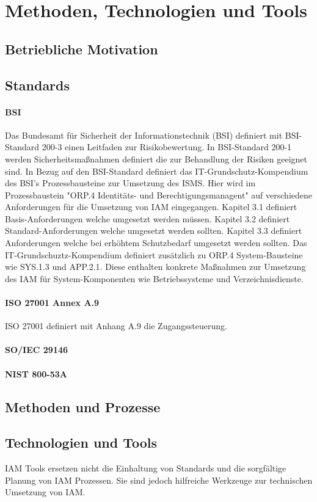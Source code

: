 \documentclass[10pt]{article}
\begin{document}
\section{Methoden, Technologien und Tools}
\subsection{Betriebliche Motivation}
\subsection{Standards}
\paragraph{BSI}
Das Bundesamt für Sicherheit der Informationstechnik (BSI) definiert mit BSI-Standard 200-3 einen Leitfaden zur Risikobewertung. In BSI-Standard 200-1 werden Sicherheitsmaßnahmen definiert die zur Behandlung der Risiken geeignet sind. In Bezug auf den BSI-Standard definiert das IT-Grundschutz-Kompendium des BSI's Prozessbausteine zur Umsetzung des ISMS. Hier wird im Prozessbaustein "ORP.4 Identitäts- und Berechtigungsmanagent" auf verschiedene Anforderungen für die Umsetzung von IAM eingegangen. Kapitel 3.1 definiert Basis-Anforderungen welche umgesetzt werden müssen. Kapitel 3.2 definiert Standard-Anforderungen welche umgesetzt werden sollten. Kapitel 3.3 definiert Anforderungen welche bei erhöhtem Schutzbedarf umgesetzt werden sollten. Das IT-Grundschuztz-Kompendium definiert zusätzlich zu ORP.4 System-Bausteine wie SYS.1.3 und APP.2.1. Diese enthalten konkrete Maßnahmen zur Umsetzung des IAM für System-Komponenten wie Betriebssysteme und Verzeichnisdienste.
\paragraph{ISO 27001 Annex A.9}
ISO 27001 definiert mit Anhang A.9 die Zugangssteuerung.
\paragraph{SO/IEC 29146}
\paragraph{NIST 800-53A}
\subsection{Methoden und Prozesse}
\subsection{Technologien und Tools}
IAM Tools ersetzen nicht die Einhaltung von Standards und die sorgfältige Planung von IAM Prozessen. Sie sind jedoch hilfreiche Werkzeuge zur technischen Umsetzung von IAM.
\end{document}
